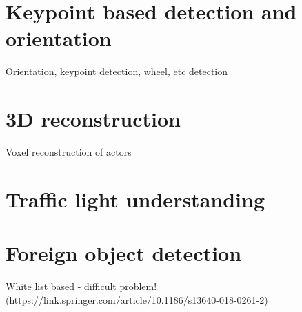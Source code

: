 \section{Keypoint based detection and orientation}
Orientation, keypoint detection, wheel, etc detection
\section{3D reconstruction}
Voxel reconstruction of actors
\section{Traffic light understanding}
\section{Foreign object detection}
White list based - difficult problem! (https://link.springer.com/article/10.1186/s13640-018-0261-2)